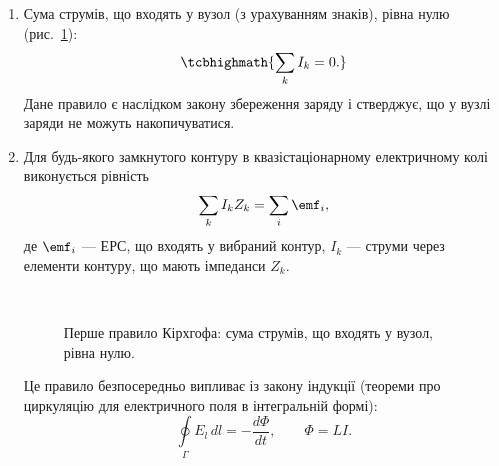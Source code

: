 \begin{enumerate}

	\item  Сума струмів, що входять у вузол (з урахуванням знаків), рівна нулю
	      (рис.~\ref{tikz:Kirchhoff}):
	      \begin{equation}\label{eq:Kirchhoff_current}
		      \tcbhighmath{
			      \sum_k I_k = 0.
		      }
	      \end{equation}
	      Дане правило є наслідком закону збереження заряду і стверджує, що у вузлі заряди не можуть накопичуватися.

	\item Для будь-якого замкнутого контуру в квазістаціонарному електричному колі виконується рівність
	      \begin{equation}\label{eq:Kirchhoff_voltage}
		      \sum_k I_k Z_k = \sum_i \emf_i,
	      \end{equation}
	      де $\emf_i$ --- ЕРС, що входять у вибраний контур, $I_k$ --- струми через елементи контуру, що мають імпеданси $Z_k$.

	      \begin{figure}
		      \centering
\		      
		      \caption{Перше правило Кірхгофа: сума струмів, що входять у вузол, рівна нулю.}
		      \label{tikz:Kirchhoff}
	      \end{figure}

	      Це правило безпосередньо випливає із закону індукції (теореми про циркуляцію для електричного поля в інтегральній формі):
	      \begin{equation}\label{eq:circulation_EMF}
		      \oint\limits_{\Gamma} E_l \, dl = -\frac{d\Phi}{dt}, \qquad \Phi = LI.
	      \end{equation}

\end{enumerate}


